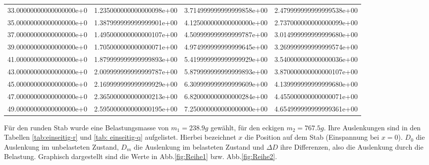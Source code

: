 \begin{table}
\begin{tabular}{S S S S}
    33.00000000000000000e+0 & 1.235000000000000098e+00 & 3.714999999999999858e+00 & 2.479999999999999538e+00\\
    35.00000000000000000e+0 & 1.387999999999999901e+00 & 4.125000000000000000e+00 & 2.737000000000000099e+00\\
    37.00000000000000000e+0 & 1.495000000000000107e+00 & 4.509999999999999787e+00 & 3.014999999999999680e+00\\
    39.00000000000000000e+0 & 1.705000000000000071e+00 & 4.974999999999999645e+00 & 3.269999999999999574e+00\\
    41.00000000000000000e+0 & 1.879999999999999893e+00 & 5.419999999999999929e+00 & 3.540000000000000036e+00\\
    43.00000000000000000e+0 & 2.009999999999999787e+00 & 5.879999999999999893e+00 & 3.870000000000000107e+00\\
    45.00000000000000000e+0 & 2.169999999999999929e+00 & 6.309999999999999609e+00 & 4.139999999999999680e+00\\
    47.00000000000000000e+0 & 2.365000000000000213e+00 & 6.820000000000000284e+00 & 4.455000000000000071e+00\\
    49.00000000000000000e+0 & 2.595000000000000195e+00 & 7.250000000000000000e+00 & 4.654999999999999361e+00\\
    \bottomrule
  \end{tabular}
\end{table}
\FloatBarrier

Für den runden Stab wurde eine Belastungsmasse von $m_1 = 238.9g$ gewählt, für den eckigen $m_2 = 767.5g$. Ihre Auslenkungen sind in den Tabellen \ref{tab:einseitig-r} und \ref{tab: einseitig-q} aufgelistet. Hierbei bezeichnet $x$ die Position auf dem Stab (Einspannung bei $x = 0$). $D_0$ die Auslenkung im unbelasteten Zustand, $ D_m$ die Auslenkung im belasteten Zustand und $\Delta D$ ihre Differenzen, also die Auslenkung durch die Belastung. Graphisch dargestellt sind die Werte in Abb.\ref{fig:Reihe1} bzw. Abb.\ref{fig:Reihe2}.

